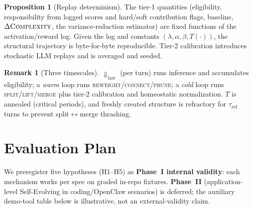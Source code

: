 \documentclass[11pt]{article}
\theoremstyle{definition}
\newtheorem{proposition}{Proposition}
\newtheorem{remark}{Remark}
\begin{document}
\begin{proposition}[Replay determinism]
The tier-1 quantities (eligibility, responsibility from logged scores and
hard/soft contribution flags, baseline, $\Delta\textsc{Complexity}$, the
variance-reduction estimator) are fixed functions of the activation/reward
log. Given the log and constants $(\lambda,\alpha,\beta,T(\cdot))$, the
structural trajectory is byte-for-byte reproducible. Tier-2 calibration
introduces stochastic LLM replays and is averaged and seeded.
\end{proposition}

\begin{remark}[Three timescales]
$\Downarrow_\text{fast}$ (per turn) runs inference and accumulates
eligibility; a \emph{warm} loop runs \textsc{reweight}/\textsc{connect}/\textsc{prune};
a \emph{cold} loop runs \textsc{split}/\textsc{lift}/\textsc{merge} plus tier-2
calibration and homeostatic normalization. $T$ is annealed (critical
periods), and freshly created structure is refractory for $\tau_\text{ref}$
turns to prevent split$\leftrightarrow$merge thrashing.
\end{remark}

\section{Evaluation Plan}
\label{sec:eval}

We preregister five hypotheses (H1--H5) as \textbf{Phase~I internal validity}:
each mechanism works per spec on graded in-repo fixtures. \textbf{Phase~II}
(application-level Self-Evolving in coding/OpenClaw scenarios) is deferred;
the auxiliary demo-tool table below is illustrative, not an external-validity claim.
\end{document}
